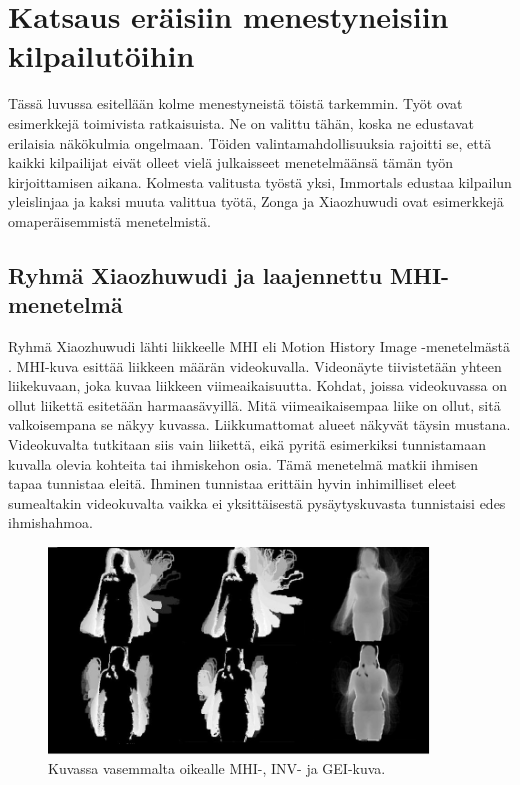 \section {Katsaus eräisiin menestyneisiin kilpailutöihin}

Tässä luvussa esitellään kolme menestyneistä töistä tarkemmin. Työt ovat esimerkkejä toimivista ratkaisuista. Ne on valittu tähän, 
koska ne edustavat erilaisia näkökulmia ongelmaan. Töiden valintamahdollisuuksia rajoitti se, että kaikki kilpailijat eivät olleet vielä julkaisseet 
menetelmäänsä tämän työn kirjoittamisen aikana. Kolmesta valitusta työstä yksi, Immortals edustaa kilpailun yleislinjaa ja kaksi muuta valittua työtä,
Zonga ja Xiaozhuwudi ovat esimerkkejä omaperäisemmistä menetelmistä.\\

\subsection{Ryhmä Xiaozhuwudi ja laajennettu MHI-menetelmä}
Ryhmä Xiaozhuwudi lähti liikkeelle MHI eli Motion History Image -menetelmästä \citep {6239179}. MHI-kuva esittää liikkeen määrän videokuvalla.
Videonäyte tiivistetään yhteen liikekuvaan, joka kuvaa liikkeen viimeaikaisuutta. Kohdat, joissa videokuvassa on ollut
liikettä esitetään harmaasävyillä. Mitä viimeaikaisempaa liike on ollut, sitä valkoisempana se näkyy kuvassa. Liikkumattomat
alueet näkyvät täysin mustana. Videokuvalta tutkitaan siis vain liikettä, eikä pyritä esimerkiksi tunnistamaan kuvalla olevia kohteita
tai ihmiskehon osia. Tämä menetelmä matkii ihmisen tapaa tunnistaa eleitä. Ihminen tunnistaa erittäin hyvin inhimilliset eleet  
sumealtakin videokuvalta vaikka ei yksittäisestä pysäytyskuvasta tunnistaisi edes ihmishahmoa. \citep {910878}  \\

\begin{figure}[htb]
  \begin{center}
    \includegraphics[width=0.9\textwidth]{mhi_ex.jpg}
    \caption{Kuvassa vasemmalta oikealle MHI-, INV- ja GEI-kuva. \citep {6239179}}
    \label{fig:mhiinvmei}
  \end{center}
\end{figure}

